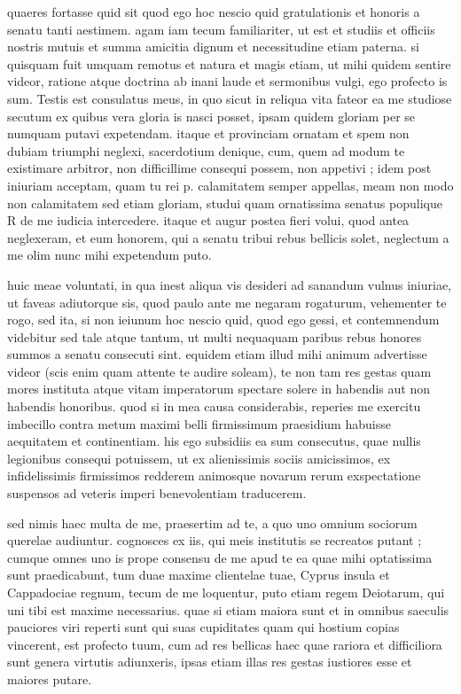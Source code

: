  quaeres fortasse quid sit quod ego hoc nescio quid gratulationis et honoris a senatu tanti aestimem. agam iam tecum familiariter, ut est et studiis et officiis nostris mutuis et summa amicitia dignum et necessitudine etiam paterna. si quisquam fuit umquam remotus et natura et magis etiam, ut mihi quidem sentire videor, ratione atque doctrina ab inani laude et sermonibus vulgi, ego profecto is sum. Testis est consulatus meus, in quo sicut in reliqua vita fateor ea me studiose secutum ex quibus vera gloria is nasci posset, ipsam quidem gloriam per se numquam putavi expetendam. itaque et provinciam ornatam et spem non dubiam triumphi neglexi, sacerdotium denique, cum, quem ad modum te existimare arbitror, non difficillime consequi possem, non appetivi ; idem post iniuriam acceptam, quam tu rei p. calamitatem semper appellas, meam non modo non calamitatem sed etiam gloriam, studui quam ornatissima senatus populique R de me iudicia intercedere. itaque et augur postea fieri volui, quod antea neglexeram, et eum honorem, qui a senatu tribui rebus bellicis solet, neglectum a me olim nunc mihi expetendum puto.

 huic meae voluntati, in qua inest aliqua vis desideri ad sanandum vulnus iniuriae, ut faveas adiutorque sis, quod paulo ante me negaram rogaturum, vehementer te rogo, sed ita, si non ieiunum hoc nescio quid, quod ego gessi, et contemnendum videbitur sed tale atque tantum, ut multi nequaquam paribus rebus honores summos a senatu consecuti sint. equidem etiam illud mihi animum advertisse videor (scis enim quam attente te audire soleam), te non tam res gestas quam mores instituta atque vitam imperatorum spectare solere in habendis aut non habendis honoribus. quod si in mea causa considerabis, reperies me exercitu imbecillo contra metum maximi belli firmissimum praesidium habuisse aequitatem et continentiam. his ego subsidiis ea sum consecutus, quae nullis legionibus consequi potuissem, ut ex alienissimis sociis amicissimos, ex infidelissimis firmissimos redderem animosque novarum rerum exspectatione suspensos ad veteris imperi benevolentiam traducerem.

 sed nimis haec multa de me, praesertim ad te, a quo uno omnium sociorum querelae audiuntur. cognosces ex iis, qui meis institutis se recreatos putant ; cumque omnes uno is prope consensu de me apud te ea quae mihi optatissima sunt praedicabunt, tum duae maxime clientelae tuae, Cyprus insula et Cappadociae regnum, tecum de me loquentur, puto etiam regem Deiotarum, qui uni tibi est maxime necessarius. quae si etiam maiora sunt et in omnibus saeculis pauciores viri reperti sunt qui suas cupiditates quam qui hostium copias vincerent, est profecto tuum, cum ad res bellicas haec quae rariora et difficiliora sunt genera virtutis adiunxeris, ipsas etiam illas res gestas iustiores esse et maiores putare.

